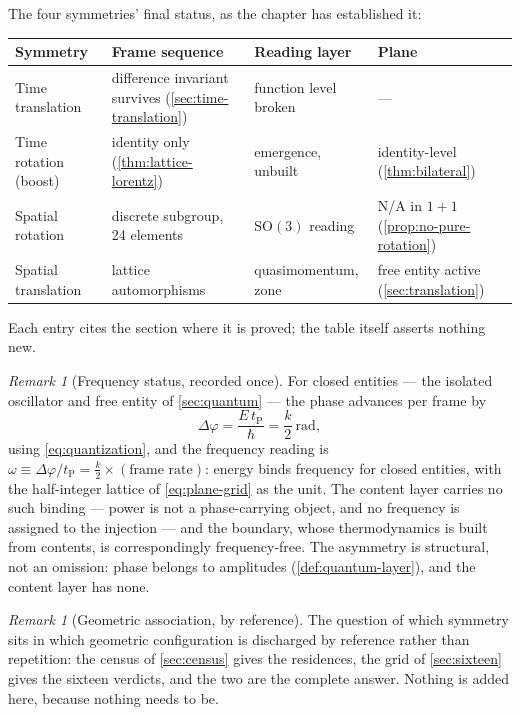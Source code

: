 \documentclass[11pt]{amsbook}
\theoremstyle{plain}
\theoremstyle{definition}
\theoremstyle{remark}
\newtheorem{remark}[theorem]{Remark}
\begin{document}
The four symmetries' final status, as the chapter has established it:
\begin{center}
\begin{tabular}{@{}p{2.2cm}p{3.5cm}p{2.7cm}p{2.7cm}@{}}
\toprule
Symmetry & Frame sequence & Reading layer & Plane \\
\midrule
Time translation & difference invariant survives (\cref{sec:time-translation}) & function level broken & --- \\
Time rotation (boost) & identity only (\cref{thm:lattice-lorentz}) & emergence, unbuilt & identity-level (\cref{thm:bilateral}) \\
Spatial rotation & discrete subgroup, 24 elements & $\mathrm{SO}(3)$ reading & N/A in $1{+}1$ (\cref{prop:no-pure-rotation}) \\
Spatial translation & lattice automorphisms & quasimomentum, zone & free entity active (\cref{sec:translation}) \\
\bottomrule
\end{tabular}
\end{center}
Each entry cites the section where it is proved; the table itself asserts nothing new.

\begin{remark}[Frequency status, recorded once]\label{rem:frequency-status}
For closed entities --- the isolated oscillator and free entity of \cref{sec:quantum} --- the phase advances per frame by
\begin{equation}\label{eq:phase-advance}
\Delta\varphi = \frac{E\,t_{\mathrm P}}{\hbar} = \frac{k}{2}\ \mathrm{rad},
\end{equation}
using \cref{eq:quantization}, and the frequency reading is $\omega \equiv \Delta\varphi/t_{\mathrm P} = \tfrac{k}{2}\times(\text{frame rate})$: energy binds frequency for closed entities, with the half-integer lattice of \cref{eq:plane-grid} as the unit. The content layer carries no such binding --- power is not a phase-carrying object, and no frequency is assigned to the injection --- and the boundary, whose thermodynamics is built from contents, is correspondingly frequency-free. The asymmetry is structural, not an omission: phase belongs to amplitudes (\cref{def:quantum-layer}), and the content layer has none.
\end{remark}

\begin{remark}[Geometric association, by reference]\label{rem:geo-association}
The question of which symmetry sits in which geometric configuration is discharged by reference rather than repetition: the census of \cref{sec:census} gives the residences, the grid of \cref{sec:sixteen} gives the sixteen verdicts, and the two are the complete answer. Nothing is added here, because nothing needs to be.
\end{remark}
\end{document}
